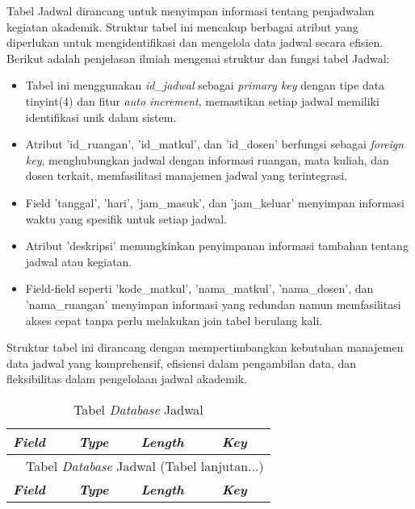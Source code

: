 \begin{enumerate}
	      Tabel Jadwal dirancang untuk menyimpan informasi tentang penjadwalan kegiatan akademik. Struktur tabel ini mencakup berbagai atribut yang diperlukan untuk mengidentifikasi dan mengelola data jadwal secara efisien. Berikut adalah penjelasan ilmiah mengenai struktur dan fungsi tabel Jadwal:

	      \begin{itemize}
		      \item Tabel ini menggunakan \textit{id\_jadwal} sebagai \textit{primary key} dengan tipe data tinyint(4) dan fitur \textit{auto increment}, memastikan setiap jadwal memiliki identifikasi unik dalam sistem.
		      \item Atribut 'id\_ruangan', 'id\_matkul', dan 'id\_dosen' berfungsi sebagai \textit{foreign key}, menghubungkan jadwal dengan informasi ruangan, mata kuliah, dan dosen terkait, memfasilitasi manajemen jadwal yang terintegrasi.
		      \item Field 'tanggal', 'hari', 'jam\_masuk', dan 'jam\_keluar' menyimpan informasi waktu yang spesifik untuk setiap jadwal.
		      \item Atribut 'deskripsi' memungkinkan penyimpanan informasi tambahan tentang jadwal atau kegiatan.
		      \item Field-field seperti 'kode\_matkul', 'nama\_matkul', 'nama\_dosen', dan 'nama\_ruangan' menyimpan informasi yang redundan namun memfasilitasi akses cepat tanpa perlu melakukan join tabel berulang kali.
	      \end{itemize}

	      Struktur tabel ini dirancang dengan mempertimbangkan kebutuhan manajemen data jadwal yang komprehensif, efisiensi dalam pengambilan data, dan fleksibilitas dalam pengelolaan jadwal akademik.

		      {
			      \fontsize{10}{12}\selectfont
			      \begin{longtable}{l l l l}
				      \caption{Tabel \textit{\textit{Database}} Jadwal}
				      \label{admin}                                                                                                   \\
				      \hline
				      \textbf{\textit{Field}} & \textbf{\textit{Type}} & \textbf{\textit{Length}} & \textbf{\textit{Key}}             \\
				      \hline
				      \endfirsthead

				      \multicolumn{4}{c}{\tablename\ \thetable\ {Tabel \textit{\textit{Database}} Jadwal} \space (Tabel lanjutan...)} \\
				      \hline
				      \textbf{\textit{Field}} & \textbf{\textit{Type}} & \textbf{\textit{Length}} & \textbf{\textit{Key}}             \\
				      \hline
				      \endhead


\end{longtable}}
\end{enumerate}

